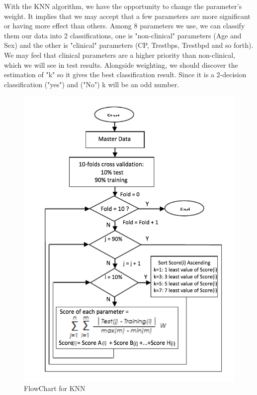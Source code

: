 \documentclass[oneside,12pt]{Classes/VTU}
\begin{document}
    		With the KNN algorithm, we have the opportunity to change the parameter's weight. It implies that we may accept that a few parameters are more significant or having more effect than others. Among 8 parameters we use, we can classify them our data into 2 classifications, one is "non-clinical" parameters (Age and Sex) and the other is "clinical" parameters (CP, Trestbps, Trestbpd and so forth). We may feel that clinical parameters are a higher priority than non-clinical, which we will see in test results. Alongside weighting, we should discover the estimation of "k" so it gives the best classification result. Since it is a 2-decision classification ("yes") and ("No") k will be an odd number.
    		
    		\begin{figure}
    			\begin{center}
    				\includegraphics[width=15cm]{images/knn.png}
    				\caption{FlowChart for KNN}
    			\end{center}
    		\end{figure}
    
\end{document}
